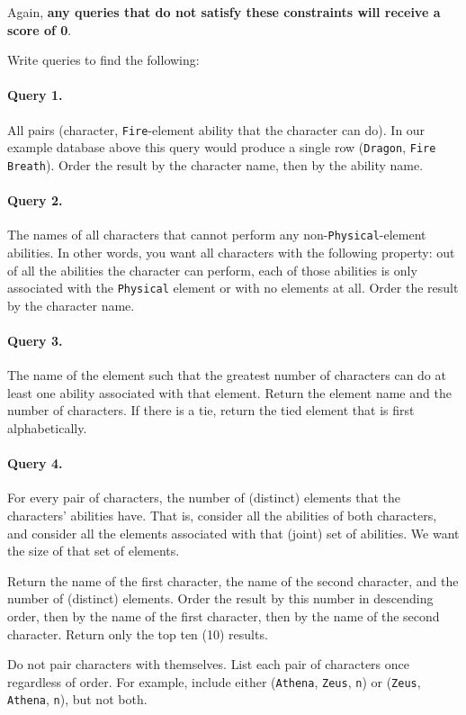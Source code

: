 \documentclass[10pt]{article}
\begin{document}
Again, \textbf{any queries that do not satisfy these constraints will receive a score of 0}.

Write queries to find the following:

\paragraph{Query 1.} All pairs (character, \texttt{Fire}-element ability that the character can do). In our example database above this query would produce a single row (\texttt{Dragon}, \texttt{Fire Breath}). Order the result by the character name, then by the ability name.

\paragraph{Query 2.} The names of all characters that cannot perform any non-\texttt{Physical}-element abilities. In other words, you want all characters with the following property: out of all the abilities the character can perform, each of those abilities is only associated with the \texttt{Physical} element or with no elements at all. Order the result by the character name.

\paragraph{Query 3.} The name of the element such that the greatest number of characters can do at least one ability associated with that element. Return the element name and the number of characters. If there is a tie, return the tied element that is first alphabetically.

\paragraph{Query 4.} For every pair of characters, the number of (distinct) elements that the characters' abilities have. That is, consider all the abilities of both characters, and consider all the elements associated with that (joint) set of abilities. We want the size of that set of elements.

Return the name of the first character, the name of the second character, and the number of (distinct) elements. Order the result by this number in descending order, then by the name of the first character, then by the name of the second character. Return only the top ten (10) results.

Do not pair characters with themselves. List each pair of characters once regardless of order. For example, include either (\texttt{Athena}, \texttt{Zeus}, \texttt{n}) or (\texttt{Zeus}, \texttt{Athena}, \texttt{n}), but not both.
\end{document}
